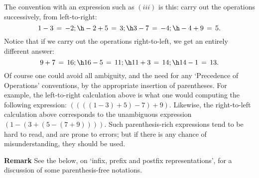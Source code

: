 {        The convention with an expression such as $(iii)$ is this: carry out the operations successively, from left-to-right:
        \begin{displaymath}
        1 - 3 \,=\, -2; \h -2 + 5 \,=\, 3; \h 3 - 7 \,=\, -4; \h -4 + 9 \,=\, 5.
        \end{displaymath}
    Notice that if we carry out the operations right-to-left, we get an entirely different answer:
        \begin{displaymath}
        9 + 7 \,=\, 16; \h 16 - 5 \,=\, 11; \h 11 + 3 \,=\, 14; \h 14 - 1 \,=\, 13.
        \end{displaymath}
    Of course one could avoid all ambiguity, and the need for any `Precedence of Operations' conventions, by the appropriate insertion of parentheses.
    For example, the left-to-right calculation above is what one would computing the following expression: $((((1 - 3) + 5) - 7) + 9)$.
    Likewise, the right-to-left calculation above corresponds to the unambiguous expression $(1 - (3 + (5 - (7 + 9))))$.
    Such parenthesis-rich expressions tend to be hard to read, and are prone to errors; but if there is any chance of misunderstanding, they should be used.

\V

        {\bf Remark} See the {\Note} below, on `infix, prefix and postfix representations', for a discussion of some parenthesis-free notations.

\VV

}

